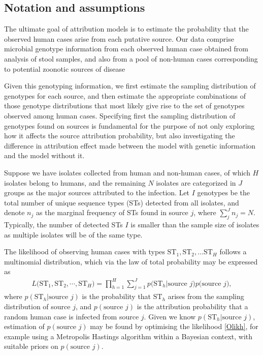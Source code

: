 \documentclass[times, doublespace]{simauth}%
\begin{document}
\subsection{Notation and assumptions}
The ultimate goal of attribution models is to estimate the probability that the observed human cases arise from each putative source. Our data comprise microbial genotype information from each observed human case obtained from analysis of stool samples, and also from a pool of non-human cases corresponding to potential zoonotic sources of disease

Given this genotyping information, we first estimate the sampling distribution of genotypes for each source, and then estimate the appropriate combinations of those genotype distributions that most likely give rise to the set of genotypes observed among human cases. Specifying first the sampling distribution of genotypes found on sources is fundamental for the purpose of not only exploring how it affects the source attribution probability, but also investigating the difference in attribution effect made between the model with genetic information and the model without it.

Suppose we have isolates collected from human and non-human cases, of which $H$ isolates belong to humans, and the remaining $N$ isolates are categorized in $J$ groups as the major sources attributed to the infection. Let $I$ genotypes be the total number of unique sequence types (STs) detected from all isolates, and denote $n_j$ as the marginal frequency of STs found in source $j$, where $\sum_j^J n_j = N$. Typically, the number of detected STs $I$ is smaller than the sample size of isolates as multiple isolates will be of the same type.

The likelihood of observing human cases with types $\text{ST}_1, \text{ST}_2, \ldots \text{ST}_H$ follows a multinomial distribution, which via the law of total probability may be expressed as
\begin{align}
  L\Big(\text{ST}_1, \text{ST}_2, \cdots, \text{ST}_H \Big)=\prod_{h=1}^{H}\sum_{j=1}^{J} p\Big(\text{ST}_h \vert \text{source } j\Big) p\Big(\text{source }j\Big),
  \label{Olikh}
\end{align}
where $p(\text{ST}_h \vert \text{source }j)$ is the probability that $\text{ST}_h$ arises from the sampling distribution of source $j$, and $p(\text{source }j)$ is the attribution probability that a random human case is infected from source $j$. Given we know $p(\text{ST}_h \vert \text{source }j)$, estimation of $p(\text{source }j)$ may be found by optimising the likelihood \eqref{Olikh}, for example using a Metropolis Hastings algorithm within a Bayesian context, with suitable priors on $p(\text{source }j)$.
\end{document}
